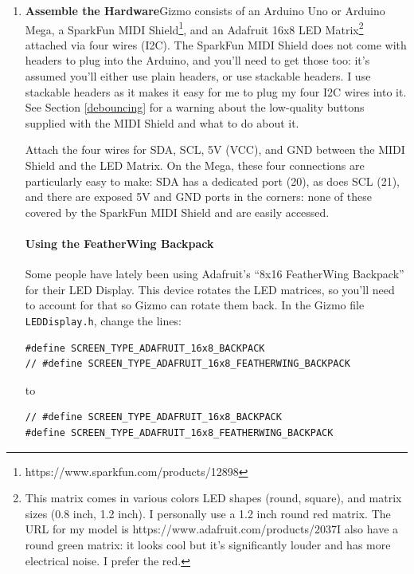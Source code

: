 \documentclass{article}
\begin{document}
\begin{enumerate}

\item {\bf Assemble the Hardware}\quad Gizmo consists of an Arduino Uno or Arduino Mega, a SparkFun MIDI Shield\footnote{https:/\!/www.sparkfun.com/products/12898}, and an Adafruit 16x8 LED Matrix\footnote{This matrix comes in various colors LED shapes (round, square), and matrix sizes (0.8 inch, 1.2 inch).  I personally use a 1.2 inch round red matrix.  The URL for my model is https:/\!/www.adafruit.com/products/2037\quad I also have a round green matrix: it looks cool but it's significantly louder and has more electrical noise.  I prefer the red.} attached via four wires (I2C).  The SparkFun MIDI Shield does not come with headers to plug into the Arduino, and you'll need to get those too: it's assumed you'll either use plain headers, or use stackable headers.  I use stackable headers as it makes it easy for me to plug my four I2C wires into it.  See Section \ref{debouncing} for a warning about the low-quality buttons supplied with the MIDI Shield and what to do about it.

Attach the four wires for SDA, SCL, 5V (VCC), and GND between the MIDI Shield and the LED Matrix.  On the Mega, these four connections are particularly easy to make: SDA has a dedicated port (20), as does SCL (21), and there are exposed 5V and GND ports in the corners: none of these covered by the SparkFun MIDI Shield and are easily accessed.

\paragraph{Using the FeatherWing Backpack} Some people have lately been using Adafruit's ``8x16 FeatherWing Backpack'' for their LED Display.  This device rotates the LED matrices, so you'll need to account for that so Gizmo can rotate them back.  In the Gizmo file \texttt{LEDDisplay.h}, change the lines:

\begin{verbatim}
#define SCREEN_TYPE_ADAFRUIT_16x8_BACKPACK
// #define SCREEN_TYPE_ADAFRUIT_16x8_FEATHERWING_BACKPACK
\end{verbatim}

to

\begin{verbatim}
// #define SCREEN_TYPE_ADAFRUIT_16x8_BACKPACK
#define SCREEN_TYPE_ADAFRUIT_16x8_FEATHERWING_BACKPACK
\end{verbatim}


\end{enumerate}
\end{document}
